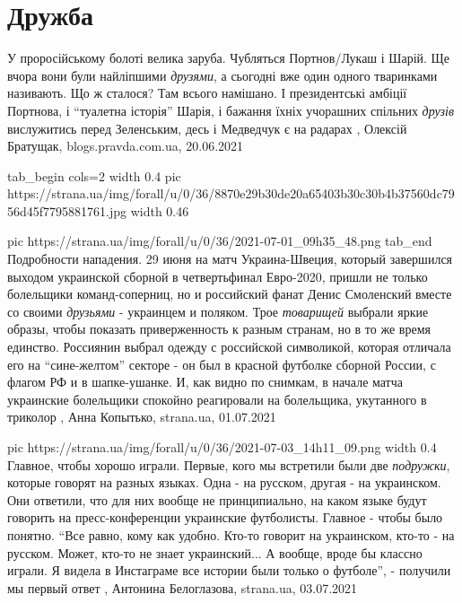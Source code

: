  
 
 
 
 
\chapter{Дружба}
\label{sec:slova.druzhba}

У проросійському болоті велика заруба. Чубляться Портнов/Лукаш і Шарій. Ще
вчора вони були найліпшими \emph{друзями}, а сьогодні вже один одного тваринками
називають. Що ж сталося? Там всього намішано. І президентські амбіції
Портнова, і \enquote{туалетна історія} Шарія, і бажання їхніх учорашних спільних \emph{друзів}
вислужитись перед Зеленським, десь і Медведчук є на радарах
, Олексій Братущак, blogs.pravda.com.ua, 20.06.2021

\ifcmt
  tab_begin cols=2
		width 0.4
     pic https://strana.ua/img/forall/u/0/36/8870e29b30de20a65403b30c30b4b37560dc7956d45f7795881761.jpg
		width 0.46

     pic https://strana.ua/img/forall/u/0/36/2021-07-01_09h35_48.png
  tab_end
\fi
Подробности нападения. 29 июня на матч Украина-Швеция, который завершился
выходом украинской сборной в четвертьфинал Евро-2020, пришли не только
болельщики команд-соперниц, но и российский фанат Денис Смоленский вместе со
своими \emph{друзьями} - украинцем и поляком. Трое \emph{товарищей} выбрали
яркие образы, чтобы показать приверженность к разным странам, но в то же время
единство.  Россиянин выбрал одежду с российской символикой, которая отличала
его на \enquote{сине-желтом} секторе - он был в красной футболке сборной
России, с флагом РФ и в шапке-ушанке.  И, как видно по снимкам, в начале матча
украинские болельщики спокойно реагировали на болельщика, укутанного в триколор
, 
Анна Копытько, strana.ua, 01.07.2021

\ifcmt
  pic https://strana.ua/img/forall/u/0/36/2021-07-03_14h11_09.png
	width 0.4
\fi
Главное, чтобы хорошо играли. Первые, кого мы встретили были две
\emph{подружки}, которые говорят на разных языках. Одна - на русском, другая -
на украинском. Они ответили, что для них вообще не принципиально, на каком
языке будут говорить на пресс-конференции украинские футболисты. Главное -
чтобы было понятно.  \enquote{Все равно, кому как удобно. Кто-то говорит на
украинском, кто-то - на русском.  Может, кто-то не знает украинский... А
вообще, вроде бы классно играли. Я видела в Инстаграме все истории были только
о футболе}, - получили мы первый ответ
, 
Антонина Белоглазова, strana.ua, 03.07.2021

